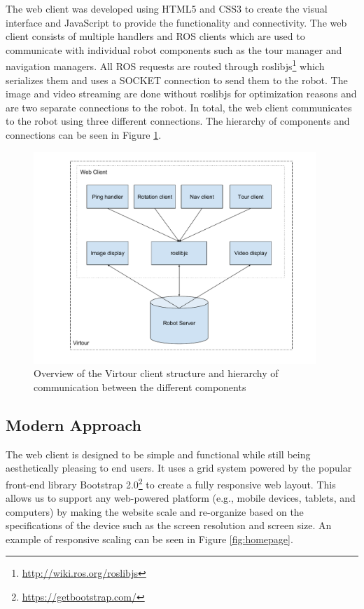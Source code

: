\documentclass[
  oneside,
  11pt, a4paper,
  footinclude=true,
  headinclude=true,
  cleardoublepage=empty
]{article}
\begin{document}
The web client was developed using HTML5 and CSS3 to create the visual
interface and JavaScript to provide the functionality and connectivity. The
web client consists of multiple handlers and ROS clients which are used to
communicate with individual robot components such as the tour manager and
navigation managers. All ROS requests are routed through
roslibjs\footnote{\url{http://wiki.ros.org/roslibjs}} which serializes them and
uses a SOCKET connection to send them to the robot. The image and video
streaming are done without roslibjs for optimization reasons and are two
separate connections to the robot. In total, the web client communicates to the
robot using three different connections. The hierarchy of components and connections
can be seen in Figure \ref{fig:client}. 

\begin{figure}[t!]
  \centering
  \includegraphics[width=0.95\textwidth]{virtour_client}
  \caption{Overview of the Virtour client structure and hierarchy of
  communication between the different components}
  \label{fig:client}
\end{figure}


\subsection{Modern Approach}

The web client is designed to be simple and functional while still being
aesthetically pleasing to end users. It uses a grid system powered by the
popular front-end library Bootstrap
2.0\footnote{\url{https://getbootstrap.com/}} to create a fully responsive web
layout. This allows us to support any web-powered platform (e.g., mobile
devices, tablets, and computers) by making the website scale and re-organize
based on the specifications of the device such as the screen resolution and
screen size. An example of responsive scaling can be seen in Figure
\ref{fig:homepage}.
\end{document}
